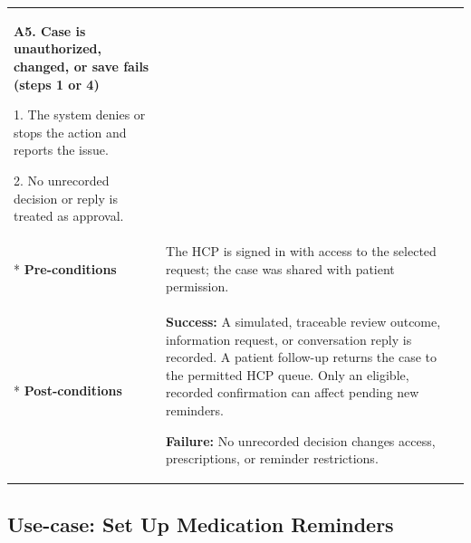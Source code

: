 \begin{longtable}{|p{}|p{}|}
\textbf{A5. Case is unauthorized, changed, or save fails (steps 1 or 4)}\par
1. The system denies or stops the action and reports the issue.\par
2. No unrecorded decision or reply is treated as approval.
\\* \hline
\textbf{Pre-conditions} &
The HCP is signed in with access to the selected request; the case was shared with patient permission.
\\* \hline
\textbf{Post-conditions} &
\textbf{Success:} A simulated, traceable review outcome, information request, or conversation reply is recorded. A patient follow-up returns the case to the permitted HCP queue. Only an eligible, recorded confirmation can affect pending new reminders.\par
\textbf{Failure:} No unrecorded decision changes access, prescriptions, or reminder restrictions.
\\ \hline

\end{longtable}


\clearpage
\subsection{Use-case: Set Up Medication Reminders}
\label{uc:uc-06}

